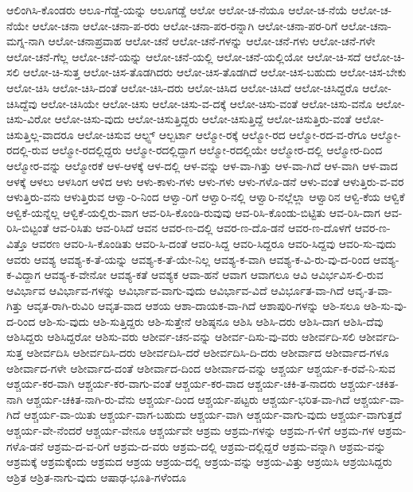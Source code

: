 {ಆಲಿಂಗಿಸಿ-ಕೊಂಡರು
ಆಲೂ-ಗೆಡ್ಡೆ-ಯನ್ನು
ಆಲೂಗಡ್ಡೆ
ಆಲೋ
ಆಲೋ-ಚ-ನೆಯೂ
ಆಲೋ-ಚ-ನೆಯೆ
ಆಲೋ-ಚ-ನೆಯೇ
ಆಲೋ-ಚನಾ
ಆಲೋ-ಚನಾ-ಪ-ರರು
ಆಲೋ-ಚನಾ-ಪರ-ರನ್ನಾಗಿ
ಆಲೋ-ಚನಾ-ಪರ-ರಿಗೆ
ಆಲೋ-ಚನಾ-ಮಗ್ನ-ನಾಗಿ
ಆಲೋ-ಚನಾಪ್ರವಾಹ
ಆಲೋ-ಚನೆ
ಆಲೋ-ಚನೆ-ಗಳನ್ನು
ಆಲೋ-ಚನೆ-ಗಳು
ಆಲೋ-ಚನೆ-ಗಳೇ
ಆಲೋ-ಚನೆ-ಗೆಲ್ಲ
ಆಲೋ-ಚನೆ-ಯನ್ನು
ಆಲೋ-ಚನೆ-ಯಲ್ಲಿ
ಆಲೋ-ಚನೆ-ಯಲ್ಲಿಯೋ
ಆಲೋ-ಚಿ-ಸದೆ
ಆಲೋ-ಚಿ-ಸಲಿ
ಆಲೋ-ಚಿ-ಸುತ್ತ
ಆಲೋ-ಚಿಸ-ತೊಡಗಿದರು
ಆಲೋ-ಚಿಸ-ತೊಡಗಿದೆ
ಆಲೋ-ಚಿಸ-ಬಹುದು
ಆಲೋ-ಚಿಸ-ಬೇಕು
ಆಲೋ-ಚಿಸಿ
ಆಲೋ-ಚಿಸಿ-ದಂತೆ
ಆಲೋ-ಚಿಸಿ-ದರು
ಆಲೋ-ಚಿಸಿದ
ಆಲೋ-ಚಿಸಿದೆ
ಆಲೋ-ಚಿಸಿದ್ದರೊ
ಆಲೋ-ಚಿಸಿದ್ದೆವು
ಆಲೋ-ಚಿಸಿಯೇ
ಆಲೋ-ಚಿಸು
ಆಲೋ-ಚಿಸು-ವ-ದಕ್ಕೆ
ಆಲೋ-ಚಿಸು-ವಂತೆ
ಆಲೋ-ಚಿಸು-ವನೊ
ಆಲೋ-ಚಿಸು-ವಿರೋ
ಆಲೋ-ಚಿಸು-ವುದು
ಆಲೋ-ಚಿಸುತ್ತಿದ್ದರು
ಆಲೋ-ಚಿಸುತ್ತಿದ್ದೆ
ಆಲೋ-ಚಿಸುತ್ತಿರು-ವಂತೆ
ಆಲೋ-ಚಿಸುತ್ತಿಲ್ಲ-ವಾದರೂ
ಆಲೋ-ಚಿಸುವ
ಆಲ್ಫ್ಸ್
ಆಲ್ಬರ್ಟಾ
ಆಲ್ಮೋ-ರಕ್ಕೆ
ಆಲ್ಮೋ-ರದ
ಆಲ್ಮೋ-ರದ-ವ-ರೆಗೂ
ಆಲ್ಮೋ-ರದಲ್ಲಿ-ರುವ
ಆಲ್ಮೋ-ರದಲ್ಲಿದ್ದರು
ಆಲ್ಮೋ-ರದಲ್ಲಿದ್ದಾಗ
ಆಲ್ಮೋ-ರದಲ್ಲಿಯೇ
ಆಲ್ಮೋರ-ದಲ್ಲಿ
ಆಲ್ಮೋರ-ದಿಂದ
ಆಲ್ಮೋರ-ವನ್ನು
ಆಲ್ಮೋರಕೆ
ಆಳ-ಆಳಕ್ಕೆ
ಆಳ-ದಲ್ಲಿ
ಆಳ-ವನ್ನು
ಆಳ-ವಾ-ಗಿತ್ತು
ಆಳ-ವಾ-ಗಿದೆ
ಆಳ-ವಾಗಿ
ಆಳ-ವಾದ
ಆಳಕ್ಕೆ
ಆಳಲು
ಆಳಸಿಂಗ
ಆಳಿದ
ಆಳು
ಆಳು-ಕಾಳು-ಗಳು
ಆಳು-ಗಳು
ಆಳು-ಗಳೊ-ಡನೆ
ಆಳು-ವಂತೆ
ಆಳುತ್ತಿರು-ವ-ವರ
ಆಳುತ್ತಿರು-ವನು
ಆಳುತ್ತಿರುವ
ಆಳ್ವಾ-ರಿ-ನಿಂದ
ಆಳ್ವಾ-ರಿಗೆ
ಆಳ್ವಾರಿ-ನಲ್ಲಿ
ಆಳ್ವಾರಿ-ನಲ್ಲೆಲ್ಲಾ
ಆಳ್ವಾರಿನ
ಆಳ್ವಿ-ಕೆಯ
ಆಳ್ವಿಕೆ
ಆಳ್ವಿಕೆ-ಯನ್ನೆಲ್ಲ
ಆಳ್ವಿಕೆ-ಯಲ್ಲಿರು-ವಾಗ
ಆವ-ರಿಸಿ-ಕೊಂಡಿ-ರುವುವು
ಆವ-ರಿಸಿ-ಕೊಂಡು-ಬಿಟ್ಟಿತು
ಆವ-ರಿಸಿ-ದಾಗ
ಆವ-ರಿಸಿ-ಬಿಟ್ಟಂತೆ
ಆವ-ರಿಸಿತು
ಆವ-ರಿಸಿದೆ
ಆವನ
ಆವರ-ಣ-ದಲ್ಲಿ
ಆವರ-ಣ-ದೊ-ಡನೆ
ಆವರ-ಣ-ದೊಳಗೆ
ಆವರ-ಣ-ವಿತ್ತೊ
ಆವರಣ
ಆವರಿ-ಸಿ-ಕೊಂಡಿತು
ಆವರಿ-ಸಿ-ದಂತೆ
ಆವರಿ-ಸಿದ್ದ
ಆವರಿ-ಸಿದ್ದರೂ
ಆವರಿ-ಸಿದ್ದವು
ಆವರಿ-ಸು-ವುದು
ಆವರು
ಆವಶ್ಯ
ಆವಶ್ಯ-ಕ-ತೆ-ಯನ್ನು
ಆವಶ್ಯ-ಕ-ತೆ-ಯೇ-ನಿಲ್ಲ
ಆವಶ್ಯ-ಕ-ವಾಗಿ
ಆವಶ್ಯ-ಕ-ವಿ-ರು-ವು-ದ-ರಿಂದ
ಆವಶ್ಯ-ಕ-ವಿದ್ದಾಗ
ಆವಶ್ಯ-ಕ-ವೇನೋ
ಆವಶ್ಯ-ಕತೆ
ಆವಶ್ಯಕ
ಆವಾ-ಹನೆ
ಆವಾಗ
ಆವಾಗಲೂ
ಆವಿ
ಆವಿರ್ಭವಿಸ-ಲಿ-ರುವ
ಆವಿರ್ಭಾವ
ಆವಿರ್ಭಾವ-ಗಳನ್ನು
ಆವಿರ್ಭಾವ-ವಾಗು-ವುದು
ಆವಿರ್ಭಾವ-ವಿದೆ
ಆವಿರ್ಭೂತ-ವಾ-ಗಿದೆ
ಆವೃ-ತ-ವಾ-ಗಿತ್ತು
ಆವೃತ-ರಾಗಿ-ರುವಿರಿ
ಆವೃತ-ವಾದ
ಆಶಯ
ಆಶಾ-ದಾಯಕ-ವಾ-ಗಿದೆ
ಆಶಾಪುರಿ-ಗಳನ್ನು
ಆಶಿ-ಸಲೂ
ಆಶಿ-ಸು-ವು-ದ-ರಿಂದ
ಆಶಿ-ಸು-ವುದು
ಆಶಿ-ಸುತ್ತಿದ್ದರು
ಆಶಿ-ಸುತ್ತೇನೆ
ಆಶಿಷ್ಠನೂ
ಆಶಿಸಿ
ಆಶಿಸಿ-ದರು
ಆಶಿಸಿ-ದಾಗ
ಆಶಿಸಿ-ದೆವು
ಆಶಿಸಿದ್ದರು
ಆಶಿಸಿದ್ದರೋ
ಆಶಿಸು-ವರು
ಆಶೀರ್ವ-ಚನ-ವನ್ನು
ಆಶೀರ್ವ-ದಿಸು-ವು-ವರು
ಆಶೀರ್ವದಿ-ಸಲಿ
ಆಶೀರ್ವದಿ-ಸುತ್ತ
ಆಶೀರ್ವದಿಸಿ
ಆಶೀರ್ವದಿಸಿ-ದರು
ಆಶೀರ್ವದಿಸಿ-ದರೆ
ಆಶೀರ್ವದಿಸಿ-ದಿ-ದರು
ಆಶೀರ್ವಾದ
ಆಶೀರ್ವಾದ-ಗಳೂ
ಆಶೀರ್ವಾದ-ಗಳೇ
ಆಶೀರ್ವಾದ-ದಂತೆ
ಆಶೀರ್ವಾದ-ದಿಂದ
ಆಶೀರ್ವಾದ-ವನ್ನು
ಆಶ್ಚರ್ಯ
ಆಶ್ಚರ್ಯ-ಕ-ರವೆ-ನಿ-ಸುವ
ಆಶ್ಚರ್ಯ-ಕರ-ವಾಗಿ
ಆಶ್ಚರ್ಯ-ಕರ-ವಾಗು-ವಂತೆ
ಆಶ್ಚರ್ಯ-ಕರ-ವಾದ
ಆಶ್ಚರ್ಯ-ಚಕಿ-ತ-ನಾದರು
ಆಶ್ಚರ್ಯ-ಚಕಿತ-ನಾಗಿ
ಆಶ್ಚರ್ಯ-ಚಕಿತ-ನಾಗಿ-ರು-ವೆನು
ಆಶ್ಚರ್ಯ-ದಿಂದ
ಆಶ್ಚರ್ಯ-ಪಟ್ಟರು
ಆಶ್ಚರ್ಯ-ಭರಿತ-ವಾ-ಗಿದೆ
ಆಶ್ಚರ್ಯ-ವಾ-ಗಿದೆ
ಆಶ್ಚರ್ಯ-ವಾ-ಯಿತು
ಆಶ್ಚರ್ಯ-ವಾಗ-ಬಹುದು
ಆಶ್ಚರ್ಯ-ವಾಗಿ
ಆಶ್ಚರ್ಯ-ವಾಗು-ವುದು
ಆಶ್ಚರ್ಯ-ವಾಗುತ್ತದೆ
ಆಶ್ಚರ್ಯ-ವೇ-ನೆಂದರೆ
ಆಶ್ಚರ್ಯ-ವೇನೂ
ಆಶ್ಚರ್ಯವೇ
ಆಶ್ರಮ
ಆಶ್ರಮ-ಗಳನ್ನು
ಆಶ್ರಮ-ಗ-ಳಿಗೆ
ಆಶ್ರಮ-ಗಳ
ಆಶ್ರಮ-ಗಳೊ-ಡನೆ
ಆಶ್ರಮ-ದ-ವ-ರಿಗೆ
ಆಶ್ರಮ-ದ-ವರು
ಆಶ್ರಮ-ದಲ್ಲಿ
ಆಶ್ರಮ-ದಲ್ಲಿದ್ದರೆ
ಆಶ್ರಮ-ವನ್ನಾಗಿ
ಆಶ್ರಮ-ವನ್ನು
ಆಶ್ರಮಕ್ಕೆ
ಆಶ್ರಮಕ್ಕೆಂದು
ಆಶ್ರಮದ
ಆಶ್ರಯ
ಆಶ್ರಯ-ದಲ್ಲಿ
ಆಶ್ರಯ-ವನ್ನು
ಆಶ್ರಯ-ವಿತ್ತು
ಆಶ್ರಯಿಸಿ
ಆಶ್ರಯಿಸಿದ್ದರು
ಆಶ್ರಿತ
ಆಶ್ರಿತ-ನಾಗು-ವುದು
ಆಷಾಢ-ಭೂತಿ-ಗಳೆಂದೂ
}
